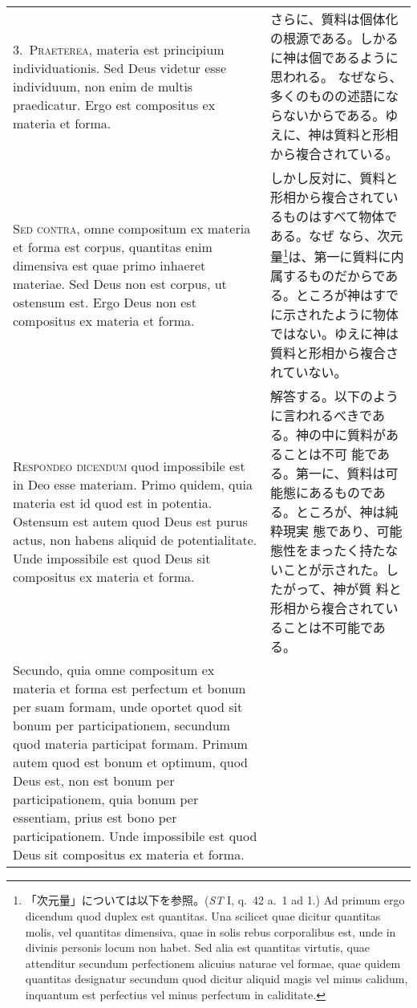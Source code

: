 \documentclass[10pt]{jsarticle}
\begin{document}
\begin{longtable}{p{21em}p{21em}}
\\


3.~\textsc{Praeterea}, materia est principium individuationis. Sed Deus
 videtur esse individuum, non enim de multis praedicatur. Ergo est
 compositus ex materia et forma.

&

さらに、質料は個体化の根源である。しかるに神は個であるように思われる。
なぜなら、多くのものの述語にならないからである。ゆえに、神は質料と形相
から複合されている。

\\


\textsc{Sed contra}, omne compositum ex materia et forma est corpus,
quantitas enim dimensiva est quae primo inhaeret materiae. Sed Deus
non est corpus, ut ostensum est. Ergo Deus non est compositus ex
materia et forma.

&


しかし反対に、質料と形相から複合されているものはすべて物体である。なぜ
なら、次元量\footnote{「次元量」については以下を参照。(\textit{ST} I,
q.~42 a.~1 ad 1.) Ad primum ergo dicendum quod duplex est
quantitas. Una scilicet quae dicitur quantitas molis, vel quantitas
dimensiva, quae in solis rebus corporalibus est, unde in divinis
personis locum non habet. Sed alia est quantitas virtutis, quae
attenditur secundum perfectionem alicuius naturae vel formae, quae
quidem quantitas designatur secundum quod dicitur aliquid magis vel
minus calidum, inquantum est perfectius vel minus perfectum in
caliditate.}は、第一に質料に内属するものだからである。ところが神はすで
に示されたように物体ではない。ゆえに神は質料と形相から複合されていない。

\\



\textsc{Respondeo dicendum} quod impossibile est in Deo esse materiam.
Primo quidem, quia materia est id quod est in potentia.  Ostensum est
autem quod Deus est purus actus, non habens aliquid de potentialitate.
Unde impossibile est quod Deus sit compositus ex materia et forma.

&

解答する。以下のように言われるべきである。神の中に質料があることは不可
能である。第一に、質料は可能態にあるものである。ところが、神は純粋現実
態であり、可能態性をまったく持たないことが示された。したがって、神が質
料と形相から複合されていることは不可能である。


\\

Secundo, quia omne compositum ex materia et forma est perfectum et
bonum per suam formam, unde oportet quod sit bonum per
participationem, secundum quod materia participat formam.  Primum
autem quod est bonum et optimum, quod Deus est, non est bonum per
participationem, quia bonum per essentiam, prius est bono per
participationem.  Unde impossibile est quod Deus sit compositus ex
materia et forma.


\end{longtable}
\end{document}
